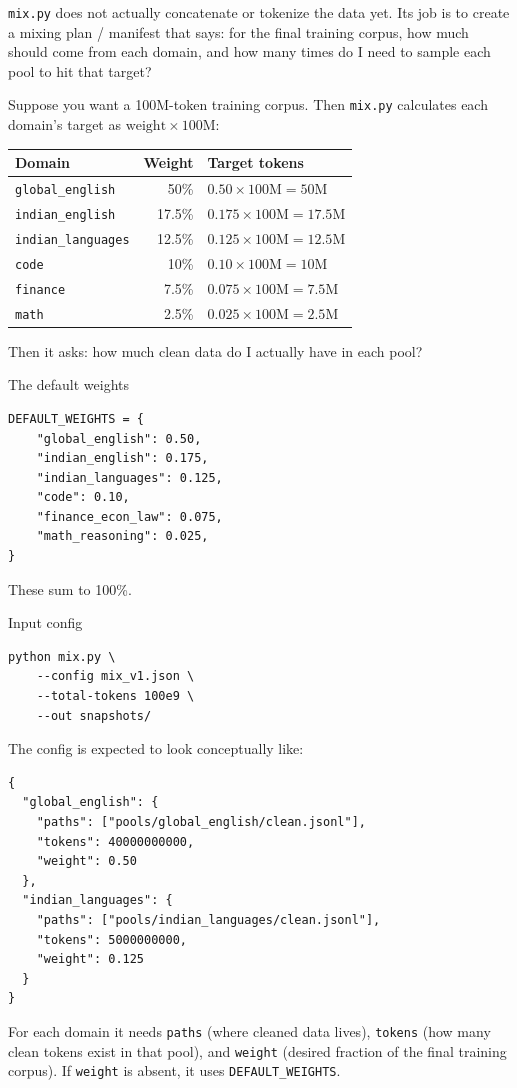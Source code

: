 \texttt{mix.py} does not actually concatenate or tokenize the data yet. Its
job is to create a mixing plan / manifest that says: for the final training
corpus, how much should come from each domain, and how many times do I need
to sample each pool to hit that target?

Suppose you want a 100M-token training corpus. Then \texttt{mix.py}
calculates each domain's target as $\text{weight}\times 100\text{M}$:
\begin{center}
  \renewcommand{\arraystretch}{1.15}
  \small
  \begin{tabular}{@{}l r l@{}}
    \textbf{Domain} & \textbf{Weight} & \textbf{Target tokens} \\
    \hline
    \texttt{global\_english} & 50\% &
    $0.50\times 100\text{M}=50\text{M}$ \\
    \texttt{indian\_english} & 17.5\% &
    $0.175\times 100\text{M}=17.5\text{M}$ \\
    \texttt{indian\_languages} & 12.5\% &
    $0.125\times 100\text{M}=12.5\text{M}$ \\
    \texttt{code} & 10\% &
    $0.10\times 100\text{M}=10\text{M}$ \\
    \texttt{finance} & 7.5\% &
    $0.075\times 100\text{M}=7.5\text{M}$ \\
    \texttt{math} & 2.5\% &
    $0.025\times 100\text{M}=2.5\text{M}$ \\
  \end{tabular}
\end{center}
Then it asks: how much clean data do I actually have in each pool?

\begin{paragraphblock}{The default weights}
\begin{lstlisting}[style=shadedpython,breaklines=true]
DEFAULT_WEIGHTS = {
    "global_english": 0.50,
    "indian_english": 0.175,
    "indian_languages": 0.125,
    "code": 0.10,
    "finance_econ_law": 0.075,
    "math_reasoning": 0.025,
}
\end{lstlisting}
  These sum to 100\%.
\end{paragraphblock}

\begin{paragraphblock}{Input config}
\begin{lstlisting}[style=shadedpython,breaklines=true]
python mix.py \
    --config mix_v1.json \
    --total-tokens 100e9 \
    --out snapshots/
\end{lstlisting}
  The config is expected to look conceptually like:
\begin{lstlisting}[style=shadedpython,breaklines=true]
{
  "global_english": {
    "paths": ["pools/global_english/clean.jsonl"],
    "tokens": 40000000000,
    "weight": 0.50
  },
  "indian_languages": {
    "paths": ["pools/indian_languages/clean.jsonl"],
    "tokens": 5000000000,
    "weight": 0.125
  }
}
\end{lstlisting}
  For each domain it needs \texttt{paths} (where cleaned data lives),
  \texttt{tokens} (how many clean tokens exist in that pool), and
  \texttt{weight} (desired fraction of the final training corpus). If
  \texttt{weight} is absent, it uses \texttt{DEFAULT\_WEIGHTS}.
\end{paragraphblock}

